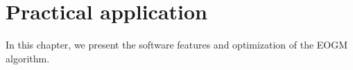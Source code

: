 \chapter{Practical application}    

In this chapter, we present the software features and optimization of the EOGM algorithm. 





